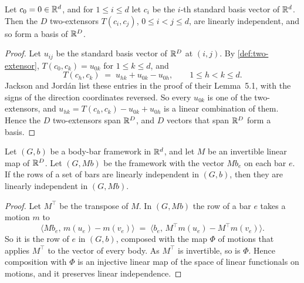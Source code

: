 \begin{lemma}
  \label{lem:coordinate-extensor-basis}
  \leanok
  Let $c_0 = 0 \in {\mathbb{R}}^d$, and for $1 \le i \le d$ let $c_i$ be the
  $i$-th standard basis vector of ${\mathbb{R}}^d$. Then the $D$ two-extensors
  $T(c_i, c_j)$, $0 \le i < j \le d$, are linearly independent, and so
  form a basis of ${\mathbb{R}}^D$.
\end{lemma}
\begin{proof}
  \leanok
  Let $u_{ij}$ be the standard basis vector of ${\mathbb{R}}^D$ at $(i, j)$. By
  \cref{def:two-extensor}, $T(c_0, c_k) = u_{0k}$ for
  $1 \le k \le d$, and
  \[
    T(c_h, c_k) \;=\; u_{hk} + u_{0k} - u_{0h},
    \qquad 1 \le h < k \le d.
  \]
  Jackson and Jord\'an list these entries in the proof of their
  Lemma~5.1, with the signs of the direction coordinates reversed. So
  every $u_{0k}$ is one of the two-extensors, and
  $u_{hk} = T(c_h, c_k) - u_{0k} + u_{0h}$ is a linear combination of
  them. Hence the $D$ two-extensors span ${\mathbb{R}}^D$, and $D$ vectors that
  span ${\mathbb{R}}^D$ form a basis.
\end{proof}

\begin{lemma}
  \label{lem:extensor-map-rows}
  \leanok
  Let $(G, b)$ be a body-bar framework in ${\mathbb{R}}^d$, and let $M$ be an
  invertible linear map of ${\mathbb{R}}^D$. Let $(G, Mb)$ be the framework with
  the vector $M b_e$ on each bar $e$. If the rows of a set of bars are
  linearly independent in $(G, b)$, then they are linearly independent
  in $(G, Mb)$.
\end{lemma}
\begin{proof}
  \leanok
  Let $M^{\top}$ be the transpose of $M$. In $(G, Mb)$ the row of a
  bar $e$ takes a motion $m$ to
  \[
    \langle M b_e,\, m(u_e) - m(v_e) \rangle
    \;=\; \langle b_e,\, M^{\top} m(u_e) - M^{\top} m(v_e) \rangle.
  \]
  So it is the row of $e$ in $(G, b)$, composed with the map $\Phi$ of
  motions that applies $M^{\top}$ to the vector of every body. As
  $M^{\top}$ is invertible, so is $\Phi$. Hence composition with
  $\Phi$ is an injective linear map of the space of linear functionals
  on motions, and it preserves linear independence.
\end{proof}


